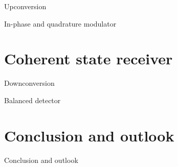 \documentclass[aspectratio=169,usenames,dvipsnames]{beamer}
\begin{document}
	\begin{frame}{Upconversion}
		
	\end{frame}
	
	\begin{frame}{In-phase and quadrature modulator}
		
	\end{frame}
	
	\section{Coherent state receiver}
	
	\begin{frame}{Downconversion}
		
	\end{frame}
	
	\begin{frame}{Balanced detector}
		
	\end{frame}
	
	\section{Conclusion and outlook}
	
	\begin{frame}{Conclusion and outlook}
	\end{frame}
	
	\appendix
	
\end{document}
